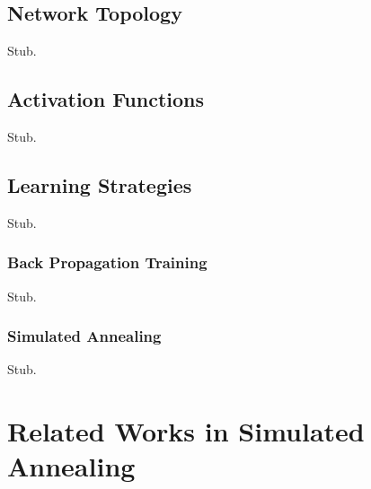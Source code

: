 \documentclass[11pt]{afthesis}
\begin{document}
	
	
	
	
	\subsection{Network Topology}
	
	Stub.
	
	\subsection{Activation Functions}
	
	Stub.
	
	\subsection{Learning Strategies}
	
	Stub.
	
	
	
	
	\subsubsection{Back Propagation Training} \label{sec:backpropTraining}
	Stub.
	
	
	
	
	
	
	
	\subsubsection{Simulated Annealing} 
	Stub.
	
	
	
	\section{Related Works in Simulated Annealing} \label{eq:simulatedAnnealing}
	
\end{document}

